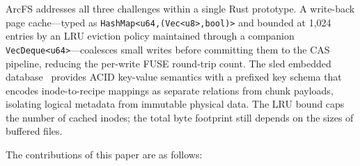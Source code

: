\documentclass[journal]{IEEEtran}
\begin{document}
ArcFS addresses all three challenges within a single Rust prototype.
A write-back page cache---typed as
\texttt{HashMap\textless{}u64,\;(Vec\textless{}u8\textgreater{},\;bool)\textgreater{}}
and bounded at 1,024 entries by an LRU eviction policy maintained through
a companion \texttt{VecDeque\textless{}u64\textgreater{}}---coalesces
small writes before committing them to the CAS pipeline, reducing the
per-write FUSE round-trip count. The sled embedded database~\cite{sled2024}
provides ACID key-value semantics with a prefixed key schema that encodes
inode-to-recipe mappings as separate relations from chunk payloads,
isolating logical metadata from immutable physical data. The LRU bound
caps the number of cached inodes; the total byte footprint still depends
on the sizes of buffered files.

The contributions of this paper are as follows:
\end{document}
